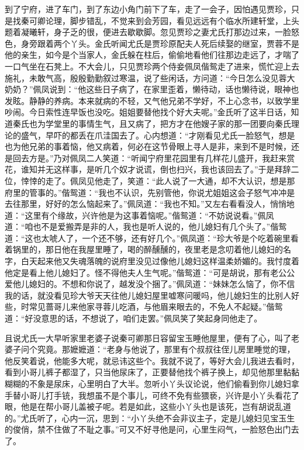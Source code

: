 \documentclass[12pt,oneside]{book}
\begin{document}
到了宁府，进了车门，到了东边小角门前下了车，走了一会子，因怕遇见贾珍，只是找秦可卿论理，脚步错乱，不觉来到会芳园，看见远远有个临水所建轩堂，上头题着凝曦轩，身子乏的很，便进去歇歇脚。忽见贾珍之妻尤氏打那边过来，一脸怒色，身旁跟着两个丫头。金氏听闻尤氏是贾珍原配夫人死后续娶的继室，贾蓉不是他的亲生，如今是个当家人，金氏躲在柱后，偷偷地看他们往那边走远了，才喘了一口气坐在石凳上。不大会儿，只见贾珍两个侍妾佩凤偕鸳走了进来，慌忙迎上去施礼，未敢气高，殷殷勤勤叙过寒温，说了些闲话，方问道：“今日怎么没见蓉大奶奶？”佩凤说到：“他这些日子病了，在家里歪着，懒待动，话也懒待说，眼神也发眩。静静的养病。本来就病的不轻，又气他兄弟不学好，不上心念书，以致学里吵闹。今日索性连早饭也没吃。姐姐要替他找个好大夫呢。”金氏听了这半日话，知道秦氏也为学堂里的事情生气，且又病了，把方才在他嫂子家的那一团要向秦氏理论的盛气，早吓的都丢在爪洼国去了。心内想道：“才刚看见尤氏一脸怒气，想是也为他兄弟的事着恼，他又病着，何必在这节骨眼上寻人是非，来到不是时候，还是回去方是。”乃对佩凤二人笑道：“听闻宁府里花园里有几样花儿盛开，我赶来赏花，谁知并无这样事，是听几个奴才说谎，倒也扫兴，我也该回去了。”于是拜辞二位，悻悻的走了。佩凤见他走了，笑道：“此人说了一大通，却不大认识，想是那府里的管事的。”偕鸳道：“我也不认识，先别管他，你说尤姐姐这会子怒气冲冲是去往那里，好好的怎么恼起来了。”佩凤道：“我也不知。”又左右看看没人，悄悄地道：“这里有个缘故，兴许他是为这事着恼呢。”偕鸳道：“不妨说说看。”佩凤道：“咱也不是爱搬弄是非的人，我也是听人说的，他儿媳妇有几个头了。”偕鸳道：“这也太唬人了，一个还不够，还有好几个。”佩凤道：“珍大爷是个吃着碗里看着锅里的，那日他在我屋里睡了，喝的醉醺醺的，夜里老是念叨着他儿媳妇的名字，白天起来他又失魂落魄的说府里没见过像他儿媳妇这样温柔娇媚的。我忖度着他定是看上他儿媳妇了。怪不得他夫人生气呢。”偕鸳道：“可是胡说，那有老公公爱他儿媳妇的。不想和你说了，越发没个捆了。”佩凤道：“妹妹怎么恼了，你不信我的话，就没看见珍大爷天天往他儿媳妇屋里嘘寒问暖吗，他儿媳妇生的比别人好些，时常见蔷哥儿来他家寻蓉儿吃酒，与他眉来眼去的，不免人不起疑。”偕鸳道：“好没意思的话，不想说了，咱们走罢。”佩凤笑了笑起身同他走了。

且说尤氏一大早听家里老婆子说秦可卿那日容留宝玉睡他屋里，便有了心，叫了老婆子问个究竟。那嬷嬷道：“老身与他说了，那里有个叔叔往侄儿房里睡觉的理，他反笑着说，他能多大呢，就忌讳这些个。我就不说了，等好大会儿我进去看时，看到小哥儿裤子都湿了，只当他尿床了，正要替他找个裤子换上，却见他那里黏黏糊糊的不象是尿床，心里明白了大半。忽听小丫头议论说，他们偷看到你儿媳妇拿手替小哥儿打手铳，我想虽不是个事儿，可终不免有些猥亵，兴许是小丫头看花了眼，他是在帮小哥儿盖被子呢。若是如此，这些小丫头也是该死，岂有胡说乱道的。”尤氏听了，心内一沉，思到：“小丫头绝不会非议主子，定是儿媳妇见宝玉生的俊俏，禁不住做了不耻之事。”可又不好寻他是问，心里生闷气，一脸怒色出门去了。
\end{document}
